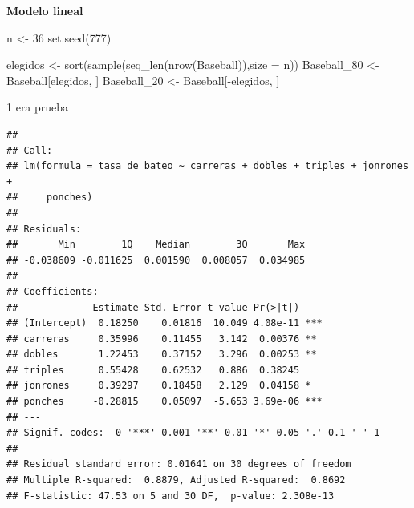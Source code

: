 \documentclass{staprojteamusb}
\newenvironment{Shaded}{\begin{snugshade}}{\end{snugshade}}
\newcommand{\AttributeTok}[1]{\textcolor[rgb]{0.77,0.63,0.00}{#1}}
\newcommand{\DecValTok}[1]{\textcolor[rgb]{0.00,0.00,0.81}{#1}}
\newcommand{\FunctionTok}[1]{\textcolor[rgb]{0.00,0.00,0.00}{#1}}
\newcommand{\NormalTok}[1]{#1}
\newcommand{\OtherTok}[1]{\textcolor[rgb]{0.56,0.35,0.01}{#1}}
\newcommand{\SpecialCharTok}[1]{\textcolor[rgb]{0.00,0.00,0.00}{#1}}
\begin{document}
 \textbf{Modelo lineal}

\begin{Shaded}
\begin{Highlighting}[]
\NormalTok{n }\OtherTok{\textless{}{-}} \DecValTok{36}
\FunctionTok{set.seed}\NormalTok{(}\DecValTok{777}\NormalTok{)}

\NormalTok{elegidos }\OtherTok{\textless{}{-}} \FunctionTok{sort}\NormalTok{(}\FunctionTok{sample}\NormalTok{(}\FunctionTok{seq\_len}\NormalTok{(}\FunctionTok{nrow}\NormalTok{(Baseball)),}\AttributeTok{size =}\NormalTok{ n))}
\NormalTok{Baseball\_80 }\OtherTok{\textless{}{-}}\NormalTok{ Baseball[elegidos, ]}
\NormalTok{Baseball\_20 }\OtherTok{\textless{}{-}}\NormalTok{ Baseball[}\SpecialCharTok{{-}}\NormalTok{elegidos, ]}
\end{Highlighting}
\end{Shaded}

 1 era prueba

\begin{Shaded}
\end{Shaded}

\begin{verbatim}
## 
## Call:
## lm(formula = tasa_de_bateo ~ carreras + dobles + triples + jonrones + 
##     ponches)
## 
## Residuals:
##       Min        1Q    Median        3Q       Max 
## -0.038609 -0.011625  0.001590  0.008057  0.034985 
## 
## Coefficients:
##             Estimate Std. Error t value Pr(>|t|)    
## (Intercept)  0.18250    0.01816  10.049 4.08e-11 ***
## carreras     0.35996    0.11455   3.142  0.00376 ** 
## dobles       1.22453    0.37152   3.296  0.00253 ** 
## triples      0.55428    0.62532   0.886  0.38245    
## jonrones     0.39297    0.18458   2.129  0.04158 *  
## ponches     -0.28815    0.05097  -5.653 3.69e-06 ***
## ---
## Signif. codes:  0 '***' 0.001 '**' 0.01 '*' 0.05 '.' 0.1 ' ' 1
## 
## Residual standard error: 0.01641 on 30 degrees of freedom
## Multiple R-squared:  0.8879, Adjusted R-squared:  0.8692 
## F-statistic: 47.53 on 5 and 30 DF,  p-value: 2.308e-13
\end{verbatim}
\end{document}
